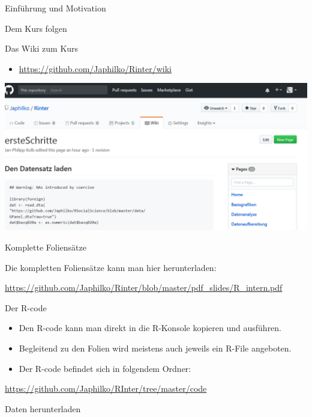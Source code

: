 \documentclass[ignorenonframetext,]{beamer}
\providecommand{\tightlist}{%
\setlength{\itemsep}{0pt}\setlength{\parskip}{0pt}}
\begin{document}
\begin{frame}[fragile]{Einführung und Motivation}
\begin{block}{Dem Kurs folgen}
\end{block}

\begin{block}{Das Wiki zum Kurs}

\begin{itemize}
\tightlist
\item
  \url{https://github.com/Japhilko/Rinter/wiki}
\end{itemize}

\includegraphics{./tex2pdf.9796/80526e6c59606398920d3ee118ec6748029b05d2.png}

\end{block}

\begin{block}{Komplette Foliensätze}

Die kompletten Foliensätze kann man hier herunterladen:

\url{https://github.com/Japhilko/Rinter/blob/master/pdf_slides/R_intern.pdf}

\end{block}

\begin{block}{Der R-code}

\begin{itemize}
\tightlist
\item
  Den R-code kann man direkt in die R-Konsole kopieren und ausführen.
\item
  Begleitend zu den Folien wird meistens auch jeweils ein R-File
  angeboten.
\item
  Der R-code befindet sich in folgendem Ordner:
\end{itemize}

\url{https://github.com/Japhilko/RInter/tree/master/code}

\end{block}

\begin{block}{Daten herunterladen}


\end{block}
\end{frame}
\end{document}
